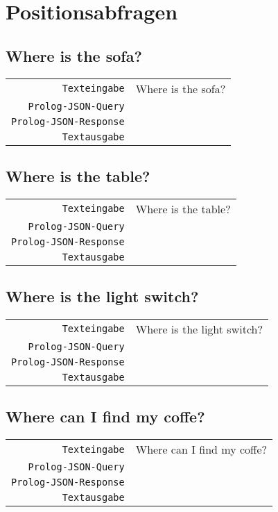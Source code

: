 \documentclass[a4paper,oneside]{scrartcl}
\begin{document}
\section{Positionsabfragen}

\subsection{Where is the sofa?}
\begin{tabular}{rl}
	\texttt{Texteingabe}		& Where is the sofa?	\\
	\texttt{Prolog-JSON-Query}	&			\\
	\texttt{Prolog-JSON-Response}	&			\\
	\texttt{Textausgabe}		& 			\\
\end{tabular}

\subsection{Where is the table?}
\begin{tabular}{rl}
	\texttt{Texteingabe}		& Where is the table?	\\
	\texttt{Prolog-JSON-Query}	&			\\
	\texttt{Prolog-JSON-Response}	&			\\
	\texttt{Textausgabe}		& 			\\
\end{tabular}

\subsection{Where is the light switch?}
\begin{tabular}{rl}
	\texttt{Texteingabe}		& Where is the light switch?	\\
	\texttt{Prolog-JSON-Query}	&			\\
	\texttt{Prolog-JSON-Response}	&			\\
	\texttt{Textausgabe}		& 			\\
\end{tabular}

\subsection{Where can I find my coffe?}
\begin{tabular}{rl}
	\texttt{Texteingabe}		& Where can I find my coffe?	\\
	\texttt{Prolog-JSON-Query}	&			\\
	\texttt{Prolog-JSON-Response}	&			\\
	\texttt{Textausgabe}		& 			\\
\end{tabular}
\end{document}
